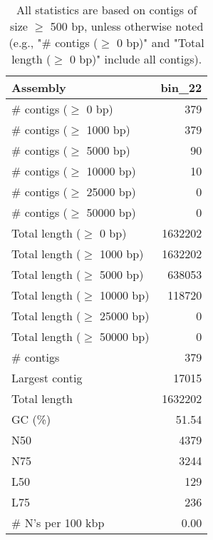 \documentclass[12pt,a4paper]{article}
\begin{document}
\begin{table}[ht]
\begin{center}
\caption{All statistics are based on contigs of size $\geq$ 500 bp, unless otherwise noted (e.g., "\# contigs ($\geq$ 0 bp)" and "Total length ($\geq$ 0 bp)" include all contigs).}
\begin{tabular}{|l*{1}{|r}|}
\hline
Assembly & bin\_22 \\ \hline
\# contigs ($\geq$ 0 bp) & 379 \\ \hline
\# contigs ($\geq$ 1000 bp) & 379 \\ \hline
\# contigs ($\geq$ 5000 bp) & 90 \\ \hline
\# contigs ($\geq$ 10000 bp) & 10 \\ \hline
\# contigs ($\geq$ 25000 bp) & 0 \\ \hline
\# contigs ($\geq$ 50000 bp) & 0 \\ \hline
Total length ($\geq$ 0 bp) & 1632202 \\ \hline
Total length ($\geq$ 1000 bp) & 1632202 \\ \hline
Total length ($\geq$ 5000 bp) & 638053 \\ \hline
Total length ($\geq$ 10000 bp) & 118720 \\ \hline
Total length ($\geq$ 25000 bp) & 0 \\ \hline
Total length ($\geq$ 50000 bp) & 0 \\ \hline
\# contigs & 379 \\ \hline
Largest contig & 17015 \\ \hline
Total length & 1632202 \\ \hline
GC (\%) & 51.54 \\ \hline
N50 & 4379 \\ \hline
N75 & 3244 \\ \hline
L50 & 129 \\ \hline
L75 & 236 \\ \hline
\# N's per 100 kbp & 0.00 \\ \hline
\end{tabular}
\end{center}
\end{table}
\end{document}
